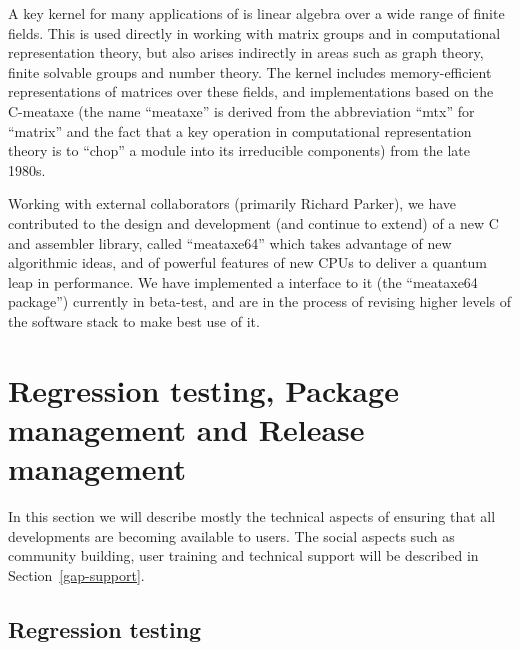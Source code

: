 \documentclass{deliverablereport}
\begin{document}
A key kernel for many applications of \GAP is linear algebra over
a wide range of finite fields. This is used directly in working with
matrix groups and in computational representation theory, but also
arises indirectly in areas such as graph theory, finite solvable
groups and number theory. The \GAP kernel includes memory-efficient
representations of matrices over these fields, and implementations
based on the C-meataxe (the name ``meataxe'' is derived from the
abbreviation ``mtx'' for ``matrix'' and the fact that a key operation
in computational representation theory is to ``chop'' a module into
its irreducible components) from the late 1980s.

Working with external collaborators (primarily Richard Parker),
we have contributed to the design and development (and continue to extend) of a new C and
assembler library, called ``meataxe64'' which takes
advantage of new algorithmic ideas, and of powerful features of new
CPUs to deliver a quantum leap in performance. We have implemented a
\GAP interface to it (the ``meataxe64 \GAP package'') currently in
beta-test, and are in the
process of revising higher levels of the software stack to make best
use of it.




\section{Regression testing, Package management and Release management}\label{gap-infra}

In this section we will describe mostly the technical aspects of
ensuring that all developments are becoming available to users.
The social aspects such as community building, user training
and technical support will be described in Section~\ref{gap-support}.

\subsection{Regression testing}\label{testing}
\end{document}
